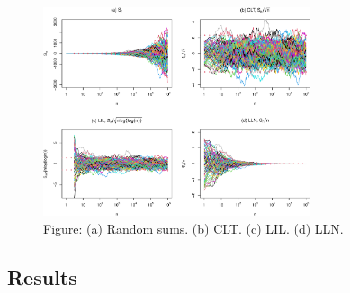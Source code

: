 \documentclass[
  13pt,
  letterpaper,
  DIV=11,
  numbers=noendperiod]{scrreprt}
\theoremstyle{plain}
\theoremstyle{definition}
\theoremstyle{definition}
\theoremstyle{plain}
\theoremstyle{definition}
\theoremstyle{plain}
\theoremstyle{remark}
\begin{document}
\begin{figure}[th]

{\centering \includegraphics[width=0.7\textwidth,height=\textheight]{lil_files/figure-pdf/unnamed-chunk-2-1.pdf}

}

\caption{Figure: (a) Random sums. (b) CLT. (c) LIL. (d) LLN.}

\end{figure}%

\subsection{Results}\label{results}
\end{document}
